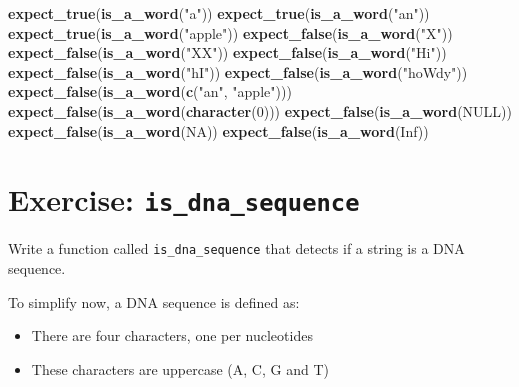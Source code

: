 \documentclass[]{book}
\newenvironment{Shaded}{}{}
\newcommand{\DecValTok}[1]{\textcolor[rgb]{0.25,0.63,0.44}{#1}}
\newcommand{\KeywordTok}[1]{\textcolor[rgb]{0.00,0.44,0.13}{\textbf{#1}}}
\newcommand{\NormalTok}[1]{#1}
\newcommand{\OtherTok}[1]{\textcolor[rgb]{0.00,0.44,0.13}{#1}}
\newcommand{\StringTok}[1]{\textcolor[rgb]{0.25,0.44,0.63}{#1}}
\providecommand{\tightlist}{%
  \setlength{\itemsep}{0pt}\setlength{\parskip}{0pt}}
\begin{document}
\begin{Shaded}
\begin{Highlighting}[]
\KeywordTok{expect_true}\NormalTok{(}\KeywordTok{is_a_word}\NormalTok{(}\StringTok{"a"}\NormalTok{))}
\KeywordTok{expect_true}\NormalTok{(}\KeywordTok{is_a_word}\NormalTok{(}\StringTok{"an"}\NormalTok{))}
\KeywordTok{expect_true}\NormalTok{(}\KeywordTok{is_a_word}\NormalTok{(}\StringTok{"apple"}\NormalTok{))}
\KeywordTok{expect_false}\NormalTok{(}\KeywordTok{is_a_word}\NormalTok{(}\StringTok{"X"}\NormalTok{))}
\KeywordTok{expect_false}\NormalTok{(}\KeywordTok{is_a_word}\NormalTok{(}\StringTok{"XX"}\NormalTok{))}
\KeywordTok{expect_false}\NormalTok{(}\KeywordTok{is_a_word}\NormalTok{(}\StringTok{"Hi"}\NormalTok{))}
\KeywordTok{expect_false}\NormalTok{(}\KeywordTok{is_a_word}\NormalTok{(}\StringTok{"hI"}\NormalTok{))}
\KeywordTok{expect_false}\NormalTok{(}\KeywordTok{is_a_word}\NormalTok{(}\StringTok{"hoWdy"}\NormalTok{))}
\KeywordTok{expect_false}\NormalTok{(}\KeywordTok{is_a_word}\NormalTok{(}\KeywordTok{c}\NormalTok{(}\StringTok{"an"}\NormalTok{, }\StringTok{"apple"}\NormalTok{)))}
\KeywordTok{expect_false}\NormalTok{(}\KeywordTok{is_a_word}\NormalTok{(}\KeywordTok{character}\NormalTok{(}\DecValTok{0}\NormalTok{)))}
\KeywordTok{expect_false}\NormalTok{(}\KeywordTok{is_a_word}\NormalTok{(}\OtherTok{NULL}\NormalTok{))}
\KeywordTok{expect_false}\NormalTok{(}\KeywordTok{is_a_word}\NormalTok{(}\OtherTok{NA}\NormalTok{))}
\KeywordTok{expect_false}\NormalTok{(}\KeywordTok{is_a_word}\NormalTok{(}\OtherTok{Inf}\NormalTok{))}
\end{Highlighting}
\end{Shaded}

\hypertarget{exercise-is_dna_sequence}{%
\section{\texorpdfstring{Exercise: \texttt{is\_dna\_sequence}}{Exercise: is\_dna\_sequence}}\label{exercise-is_dna_sequence}}

Write a function called \texttt{is\_dna\_sequence} that detects if a string is
a DNA sequence.

To simplify now, a DNA sequence is defined as:

\begin{itemize}
\tightlist
\item
  There are four characters, one per nucleotides
\item
  These characters are uppercase (A, C, G and T)
\end{itemize}
\end{document}
